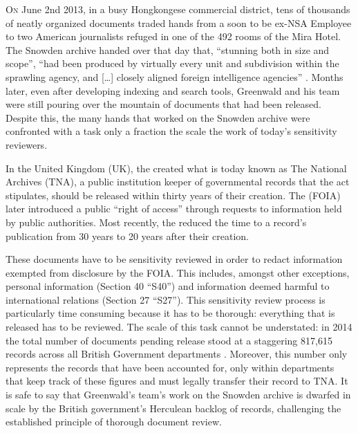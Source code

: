 \documentclass[\version]{l4proj}
\begin{document}
\lettrine[lines=3,nindent=0em]{O}{n} June 2nd 2013, in a busy Hongkongese commercial district, tens of thousands of neatly organized documents traded hands from a soon to be ex-NSA Employee to two American journalists refuged in one of the 492 rooms of the Mira Hotel.
The Snowden archive handed over that day that, ``stunning both in size and scope'', ``had been produced by virtually every unit and subdivision within the sprawling agency, and [\ldots] closely aligned foreign intelligence agencies'' \autocite[77]{greenwaldNoPlaceHide2014}.
Months later, even after developing indexing and search tools, Greenwald and his team were still pouring over the mountain of documents that had been released.
Despite this, the many hands that worked on the Snowden archive were confronted with a task only a fraction the scale the work of today's sensitivity reviewers.

In the United Kingdom (UK), the \textcite{PublicRecordsAct1958} created what is today known as The National Archives (TNA), a public institution keeper of governmental records that the act stipulates, should be released within thirty years of their creation.
The \textcite{FreedomInformationAct2000} (FOIA) later introduced a public ``right of access'' through requests to information held by public authorities.
Most recently, the \textcite{ConstitutionalReformGovernance2010} reduced the time to a record's publication from 30 years to 20 years after their creation.

These documents have to be sensitivity reviewed in order to redact information exempted from disclosure by the FOIA.
This includes, amongst other exceptions, personal information (Section 40 ``S40'') and information deemed harmful to international relations (Section 27 ``S27''). %
This sensitivity review process is particularly time consuming because it has to be thorough: everything that is released has to be reviewed.
The scale of this task cannot be understated: in 2014 the total number of documents pending release stood at a staggering 817,615 records across all British Government departments \autocite{allanRecordsReview2014,thenationalarchivesRecordTransferReport2014}.
Moreover, this number only represents the records that have been accounted for, only within departments that keep track of these figures and must legally transfer their record to TNA.
It is safe to say that Greenwald's team's work on the Snowden archive is dwarfed in scale by the British government's Herculean backlog of records, challenging the established principle of thorough document review.
\end{document}
